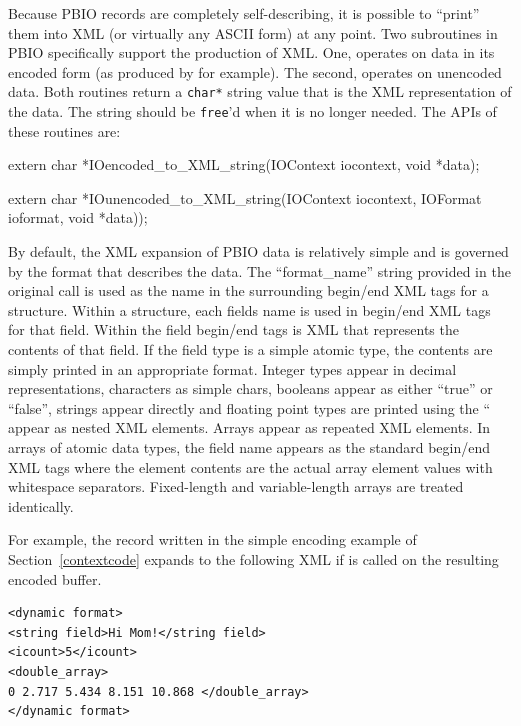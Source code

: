 Because PBIO records are completely self-describing, it is possible to
``print'' them into XML (or virtually any ASCII form) at any point.  Two
subroutines in PBIO specifically support the production of XML.  One,
 operates on data in its encoded form
(as produced by  for example).  The
second,  operates on unencoded data.
Both routines return a {\tt char*} string value that is the XML
representation of the data.  The string should be {\tt free}'d when it is no
longer needed.  The APIs of these routines are:
\begin{WrapCode}
extern char *IOencoded_to_XML_string(IOContext iocontext, void *data);

extern char *IOunencoded_to_XML_string(IOContext iocontext, IOFormat ioformat, void *data));
\end{WrapCode}
By default, the XML expansion of PBIO data is relatively simple and is
governed by the format that describes the data.  The
``format\_name'' string provided in the original
 call is used as the name in the
surrounding begin/end XML tags for a structure.  Within a structure, each
fields name is used in begin/end XML tags for that field.  Within the field
begin/end tags is XML that represents the contents of that field.  If the
field type is a simple atomic type, the contents are simply printed in an
appropriate format.  Integer types appear in decimal representations,
characters as simple chars, booleans appear as either ``true'' or ``false'',
strings appear directly and floating point types are printed using the
``%
appear as nested XML elements.  Arrays appear as repeated XML elements.  In
arrays of atomic data types, the field name appears as the standard
begin/end XML tags where the element contents are the actual array element
values with whitespace separators.  Fixed-length and variable-length arrays
are treated identically.

For example, the record written in the simple encoding example of
Section~\ref{contextcode} expands to the following XML if
 is called on the resulting encoded
buffer. 
\begin{verbatim}
<dynamic format>
<string field>Hi Mom!</string field>
<icount>5</icount>
<double_array>
0 2.717 5.434 8.151 10.868 </double_array>
</dynamic format>
\end{verbatim}

